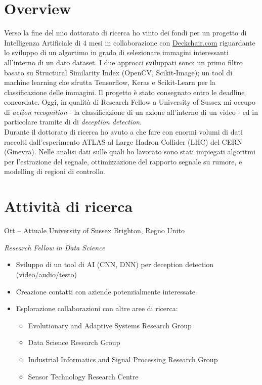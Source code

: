\documentclass[print]{cv} %
\begin{document}

\section{Overview}

Verso la fine del mio dottorato di ricerca ho vinto dei fondi per un progetto di Intelligenza Artificiale di 4 mesi in collaborazione con \href{http://www.deckchair.com}{Deckchair.com} riguardante lo sviluppo di un algortimo in grado di selezionare immagini interessanti all'interno di un dato dataset. I due approcci sviluppati sono: un primo filtro basato su Structural Similarity Index (OpenCV, Scikit-Image); un tool di machine learning che sfrutta Tensorflow, Keras e Scikit-Learn per la classificazione delle immagini. Il progetto è stato consegnato entro le deadline concordate. Oggi, in qualità di Research Fellow a University of Sussex mi occupo di \emph{action recognition} - la classificazione di un azione all'interno di un video - ed in particolare tramite di  di \emph{deception detection}. \\Durante il dottorato di ricerca ho avuto a che fare con enormi volumi di dati raccolti dall'esperimento ATLAS al Large Hadron Collider (LHC) del CERN (Ginevra). Nelle analisi dati sulle quali ho lavorato sono stati impiegati algoritmi per l'estrazione del segnale, ottimizzazione del rapporto segnale su rumore, e modelling di regioni di controllo.


\section{Attività di ricerca}

  \begin{entrylist}
    \entry
    {Ott -- Attuale}
    {University of Sussex}
    {Brighton, Regno Unito}
    {\emph{Research Fellow in Data Science}
    \begin{itemize}
      \item Sviluppo di un tool di AI (CNN, DNN) per deception detection (video/audio/testo)
      \item Creazione contatti con aziende potenzialmente interessate
      \item Esplorazione collaborazioni con altre aree di ricerca:
      \begin{itemize}
        \item Evolutionary and Adaptive Systems Research Group
        \item Data Science Research Group
        \item Industrial Informatics and Signal Processing Research Group
        \item Sensor Technology Research Centre
      \end{itemize}
    \end{itemize}
    }
  \end{entrylist}
\end{document}
